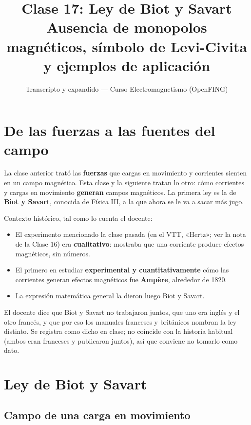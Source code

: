 \documentclass[12pt,a4paper]{article}
\title{\textbf{Clase 17: Ley de Biot y Savart} \\[0.3em]
        \large{Ausencia de monopolos magnéticos, símbolo de Levi-Civita y ejemplos de aplicación}}
\author{Transcripto y expandido --- Curso Electromagnetismo (OpenFING)}
\date{}
\begin{document}
\maketitle
\thispagestyle{empty}
\newpage

\tableofcontents
\newpage

\section{De las fuerzas a las fuentes del campo}

La clase anterior trató las \textbf{fuerzas} que cargas en movimiento y corrientes
sienten en un campo magnético. Esta clase y la siguiente tratan lo otro: cómo
corrientes y cargas en movimiento \textbf{generan} campos magnéticos. La primera ley
es la de \textbf{Biot y Savart}, conocida de Física III, a la que ahora se le va a
sacar más jugo.

Contexto histórico, tal como lo cuenta el docente:

\begin{itemize}
  \item El experimento mencionado la clase pasada (en el VTT, «Hertz»; ver la nota de
  la Clase 16) era \textbf{cualitativo}: mostraba que una corriente produce efectos
  magnéticos, sin números.
  \item El primero en estudiar \textbf{experimental y cuantitativamente} cómo las
  corrientes generan efectos magnéticos fue \textbf{Ampère}, alrededor de 1820.
  \item La expresión matemática general la dieron luego Biot y Savart.
\end{itemize}

\begin{notebox}
El docente dice que Biot y Savart no trabajaron juntos, que uno era inglés y
el otro francés, y que por eso los manuales franceses y británicos nombran la
ley distinto. Se registra como dicho en clase; no coincide con la historia
habitual (ambos eran franceses y publicaron juntos), así que conviene no
tomarlo como dato.
\end{notebox}

\section{Ley de Biot y Savart}

\subsection{Campo de una carga en movimiento}
\end{document}
